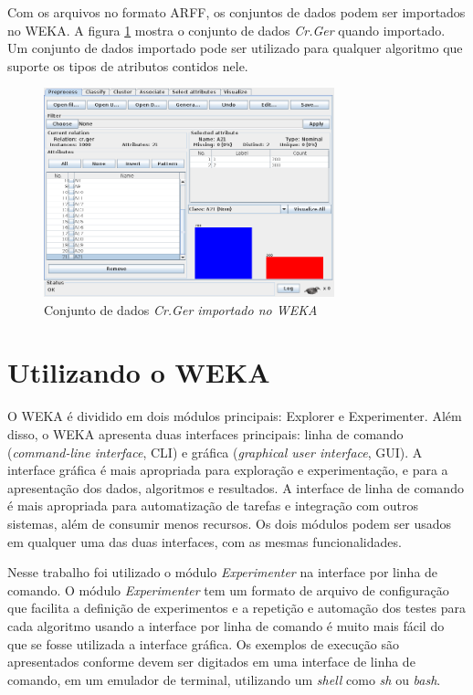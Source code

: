 Com os arquivos no formato ARFF, os conjuntos de dados podem ser importados no WEKA. A figura \ref{fig:dev_weka_arff} mostra o conjunto de dados \emph{Cr.Ger} quando importado. Um conjunto de dados importado pode ser utilizado para qualquer algoritmo que suporte os tipos de atributos contidos nele.

\vspace{0.5cm}
\begin{figure}[h!]
    \centering
    \caption{Conjunto de dados \emph{Cr.Ger importado no WEKA}}
    \label{fig:dev_weka_arff}
    \vspace{0.5cm}
    \includegraphics[width=0.75\textwidth]{img/cr_ger.png}
    \vspace{0.5cm}
\end{figure}
\vspace{0.5cm}

\section{Utilizando o WEKA}

O WEKA é dividido em dois módulos principais: Explorer e Experimenter. Além disso, o WEKA apresenta duas interfaces principais: linha de comando (\emph{command-line interface}, CLI) e gráfica (\emph{graphical user interface}, GUI). A interface gráfica é mais apropriada para exploração e experimentação, e para a apresentação dos dados, algoritmos e resultados. A interface de linha de comando é mais apropriada para automatização de tarefas e integração com outros sistemas, além de consumir menos recursos. Os dois módulos podem ser usados em qualquer uma das duas interfaces, com as mesmas funcionalidades.

Nesse trabalho foi utilizado o módulo \emph{Experimenter} na interface por linha de comando. O módulo \emph{Experimenter} tem um formato de arquivo de configuração que facilita a definição de experimentos e a repetição e automação dos testes para cada algoritmo usando a interface por linha de comando é muito mais fácil do que se fosse utilizada a interface gráfica. Os exemplos de execução são apresentados conforme devem ser digitados em uma interface de linha de comando, em um emulador de terminal, utilizando um \emph{shell} como \emph{sh} ou \emph{bash}.

